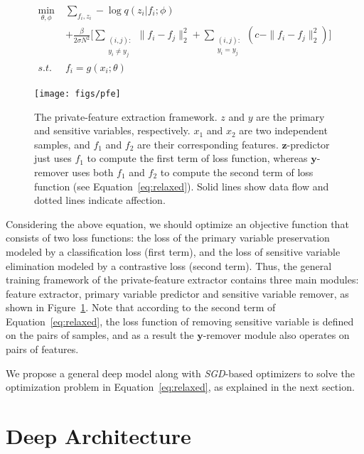 \documentclass[10pt,journal,compsoc]{IEEEtran}
\newcommand{\alert}[1]{\textcolor{purple}{#1}}
\begin{document}
\begin{align} \label{eq:relaxed}
\begin{split}
\min_{\theta, \phi}\; 
& \sum_{f_i,z_i} -\log q(z_i|f_i;\phi) \\ 
&  + \frac{\beta}{2\sigma N^2} \Big[ \sum_{\substack{(i,j):\\y_i\neq y_j}} \|f_i-f_j\|_2^2  +  \sum_{\substack{(i,j):\\y_i = y_j}} (c - \|f_i-f_j\|_2^2)  \Big]  \\
s.t.\; & f_i = g(x_i;\theta)
\end{split}
\end{align}\begin{figure}[t]
	\centering
	\texttt{[image: figs/pfe]} 
	\caption{The private-feature extraction framework. $z$ and $y$ are the primary and sensitive variables, respectively. $x_1$ and $x_2$ are two independent samples, and $f_1$ and $f_2$ are their corresponding features. $\textbf{z}$-predictor just uses $f_1$ to compute the first term of loss function, whereas $\textbf{y}$-remover uses both $f_1$ and $f_2$ to compute the second term of loss function (see Equation~\ref{eq:relaxed}). Solid lines show data flow and dotted lines indicate affection.}
	\label{fig:framework}
\end{figure}

Considering the above equation, we should optimize an objective function that consists of two loss functions: the loss of the primary variable preservation modeled by a classification loss (first term), and the loss of sensitive variable elimination modeled by a contrastive loss (second term). Thus, the general training framework of the private-feature extractor contains three main modules: feature extractor, primary variable predictor and sensitive variable remover, as shown in Figure~\ref{fig:framework}. Note that according to the second term of Equation~\ref{eq:relaxed}, the loss function of removing sensitive variable is defined on the pairs of samples, and as a result the $\textbf{y}$-remover module also operates on pairs of features.

We propose a general deep model along with \emph{SGD}-based optimizers to solve the optimization problem in Equation~\ref{eq:relaxed}, as explained in the next section. 

\section{Deep Architecture}\label{sec:deep}%
\end{document}
